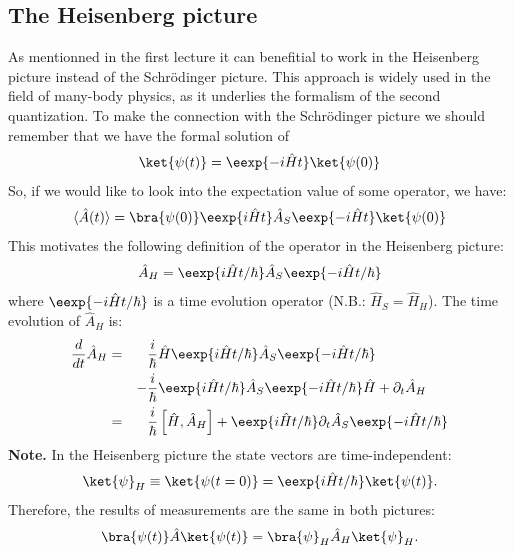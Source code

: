 \subsection{The Heisenberg picture}
As mentionned in the first lecture it can benefitial to work in the Heisenberg picture instead of the Schrödinger picture. This approach is widely used in the field of many-body physics, as it underlies the formalism of the second quantization. To make the connection with  the Schrödinger picture we should remember that we have the formal solution of
\begin{align}
\ket{\psi(t)} = \eexp{-i\hat{H}t}\ket{\psi(0)}
\end{align}
So, if we would like to look into the expectation value of some operator, we have:
\begin{align}
\langle\hat{A}(t)\rangle = \bra{\psi(0)}\eexp{i\hat{H}t}\hat{A}_S\eexp{-i\hat{H}t}\ket{\psi(0)}
\end{align}
This motivates the following definition of the operator in the Heisenberg picture:
\begin{align}
    \hat{A}_H=\eexp{i{\hat{H} t}/{\hbar}} \hat{A}_S \eexp{-i{\hat{H} t}/{\hbar}}
\end{align}
					where $\eexp{-i{\hat{H} t}/{\hbar}}$ is a time evolution operator (N.B.: $\hat{H}_S = \hat{H}_H$). The time evolution of $\hat{A}_H$ is:
					\begin{align}
						\notag \frac{d}{dt} \hat{A}_H &=&& \frac{i}{\hbar}\hat{H}\eexp{i{\hat{H}t}/{\hbar}}\hat{A}_S \eexp{-i{\hat{H} t}/{\hbar}}\\ 
						&&-&\frac{i}{\hbar} \eexp{i{\hat{H} t}/{\hbar}}\hat{A}_S \eexp{-i{\hat{H}t}/{\hbar}}\hat{H}+\partial_t \hat{A}_H\\
						&=&& \frac{i}{\hbar}\left[\hat{H},\hat{A}_H\right] + \eexp{i{\hat{H}t}/{\hbar}}\partial_t\hat{A}_S\eexp{-i{\hat{H}t}/{\hbar}}
					\end{align}
\textbf{Note.} In the Heisenberg picture the state vectors are time-in\-de\-pen\-dent:
\begin{align}
    \ket{\psi}_H \equiv \ket{\psi(t=0)}=\eexp{i{\hat{H}}t/{\hbar}} \ket{\psi(t)}.
\end{align}
Therefore, the results of measurements are the same in both pictures:
\begin{align}
 \bra{\psi(t)}\hat{A}\ket{\psi(t)} = \bra{\psi}_H \hat{A}_H \ket{\psi}_H.
\end{align}